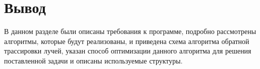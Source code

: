 \section{Вывод}
В данном разделе были описаны требования к программе, подробно рассмотрены алгоритмы, которые будут реализованы, и приведена схема алгоритма обратной трассировки лучей, указан способ оптимизации данного алгоритма для решения поставленной задачи и описаны используемые структуры.
